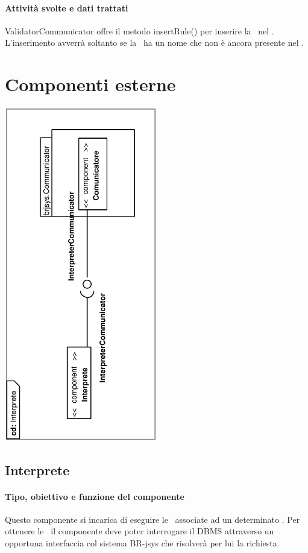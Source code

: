 \documentclass[11pt,titlepage,a4paper]{report}
\begin{document}
\subsubsection{Attivit\`a svolte e dati trattati}
ValidatorCommunicator offre il metodo insertRule() per inserire la \br\ nel \re. L'inserimento avverr\`a soltanto se la \br\ ha un nome che non \`e ancora presente nel \re.

\chapter{Componenti esterne}
\begin{center}
 \includegraphics[width=0.5\textwidth, angle=-90]{DiagrammaClassi/Interprete.eps}
\end{center}
\section{Interprete}
\subsubsection{Tipo, obiettivo e funzione del componente}
Questo componente si incarica di eseguire le \brs\ associate ad un determinato \bo. Per ottenere le \brs\ il componente deve poter interrogare il DBMS attraverso un opportuna interfaccia col sistema BR-jsys che risolver\`a per lui la richiesta.
\end{document}
